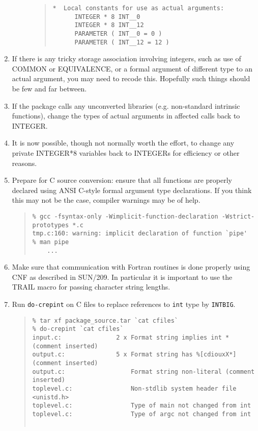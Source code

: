 \documentclass[twoside,11pt]{article}
\newcommand{\htmlref}[2]{#1}
\newcommand{\html}[1]{}
\newcommand{\xref}[3]{#1}
\renewcommand{\_}{\texttt{\symbol{95}}}
\newcommand{\xdofilter}[1]{\htmlref{{\tt do-#1}}{do-xxx}}
\newcommand{\cc}[1]{{\tt #1}}
\newenvironment{squote}{\begin{quote}\begin{small}}{\end{small}\end{quote}}
\begin{document}
\begin{enumerate}
\begin{description}
\begin{squote}
\begin{verbatim}
*  Local constants for use as actual arguments:
      INTEGER * 8 INT__0
      INTEGER * 8 INT__12
      PARAMETER ( INT__0 = 0 )
      PARAMETER ( INT__12 = 12 )
\end{verbatim}
\end{squote}
%
\end{description}
%
\item
If there is any tricky storage association involving integers,
such as use of COMMON or EQUIVALENCE, or a formal argument of
different type to an actual argument, you may need to recode this.
Hopefully such things should be few and far between.
\html{\begin{squote}\end{squote}}
%
\item
If the package calls any unconverted libraries
(e.g. non-standard intrinsic functions), change the types of
actual arguments in affected calls back to INTEGER.
\html{\begin{squote}\end{squote}}
%
\item
It is now possible, though not normally worth the effort,
to change any private INTEGER*8 variables back to INTEGERs
for efficiency or other reasons.
\html{\begin{squote}\end{squote}}
%
\item
Prepare for C source conversion: ensure that all functions are
properly declared using ANSI C-style formal argument type declarations.
If you think this may not be the case, compiler warnings may be of help.
\begin{squote}
\begin{verbatim}
% gcc -fsyntax-only -Wimplicit-function-declaration -Wstrict-prototypes *.c
tmp.c:160: warning: implicit declaration of function `pipe'
% man pipe
    ...
\end{verbatim}
\end{squote}
%
\item
Make sure that communication with Fortran routines is done properly
using CNF as described in \xref{SUN/209}{sun209}{}.
In particular it is important to use the \xref{TRAIL}{sun209}{TRAIL}
macro for passing character string lengths.
\html{\begin{squote}\end{squote}}
%
\item
Run \xdofilter{crepint} on C files to replace references to \cc{int} type
by \cc{INT\_BIG}.
\begin{squote}
\begin{verbatim}
% tar xf package_source.tar `cat cfiles`
% do-crepint `cat cfiles`
input.c:               2 x Format string implies int * (comment inserted)
output.c:              5 x Format string has %[cdiouxX*] (comment inserted)
output.c:                  Format string non-literal (comment inserted)
toplevel.c:                Non-stdlib system header file <unistd.h>
toplevel.c:                Type of main not changed from int
toplevel.c:                Type of argc not changed from int


\end{verbatim}
\end{squote}
\end{enumerate}
\end{document}
